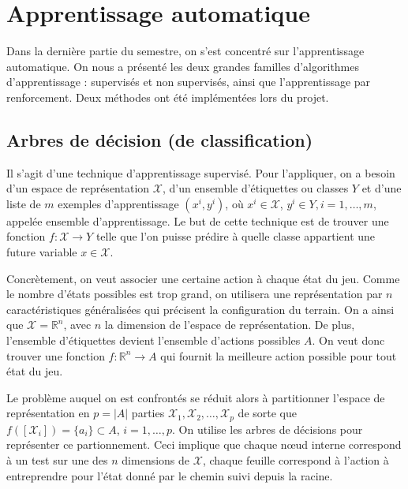 \documentclass[12pt,a4paper]{article}
\begin{document}
\section{Apprentissage automatique}
Dans la derni\`ere partie du semestre, on s'est concentr\'e sur l'apprentissage 
automatique. On nous a pr\'esent\'e les deux grandes familles 
d'algorithmes d'apprentissage : supervis\'es et non supervis\'es, ainsi que 
l'apprentissage par renforcement. Deux m\'ethodes ont \'et\'e impl\'ement\'ees 
lors du projet.

\subsection*{Arbres de d\'ecision (de classification)}
Il s'agit d'une technique d'apprentissage supervis\'e. Pour l'appliquer, on 
a besoin d'un espace de repr\'esentation $\mathcal{X}$, d'un ensemble 
d'\'etiquettes ou classes $Y$ et d'une liste de $m$ exemples d'apprentissage 
$(x^i,y^i)$, o\`u $x^i \in \mathcal{X}$, $y^i \in Y, i = 1,\dotsc,m$, appel\'ee 
ensemble d'apprentissage.
Le but de cette technique est de trouver une fonction $f: \mathcal{X} \to 
Y$ telle que l'on puisse pr\'edire \`a quelle classe appartient une 
future variable $x \in \mathcal{X}$.

Concr\`etement, on veut associer une certaine action \`a chaque \'etat du jeu. 
Comme le nombre d'\'etats possibles est trop grand, on utilisera une 
repr\'esentation par $n$ caract\'eristiques g\'en\'eralis\'ees qui 
pr\'ecisent la configuration du terrain. On a ainsi que $\mathcal{X} = 
\mathbb{R}^n$, avec $n$ la dimension de l'espace de repr\'esentation. De plus, 
l'ensemble d'\'etiquettes devient l'ensemble d'actions possibles $A$. On veut 
donc trouver une fonction $f: \mathbb{R}^n \to A$ qui fournit la meilleure 
action possible pour tout \'etat du jeu.

Le probl\`eme auquel on est confront\'es se r\'eduit alors \`a 
partitionner l'espace de repr\'esentation en $p=|A|$ parties 
$\mathcal{X}_1,\mathcal{X}_2,\dotsc,\mathcal{X}_p$ de sorte que 
$f([\mathcal{X}_i]) = \{ a_i \} \subset A$, $i = 1,\dotsc,p$. On utilise les 
arbres de d\'ecisions pour repr\'esenter ce partionnement. Ceci 
implique que chaque n\oe ud interne correspond \`a un test sur une des $n$ 
dimensions de $\mathcal{X}$, chaque feuille correspond \`a l'action \`a 
entreprendre pour l'\'etat donn\'e par le chemin suivi depuis la racine.
\end{document}
